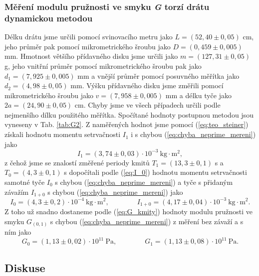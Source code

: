\documentclass[english]{article}
\newcommand{\unit}[1]{\mathrm{#1}}
\begin{document}
			\subsubsection{Měření modulu pružnosti ve smyku \emph{G} torzí drátu dynamickou metodou}
						Délku drátu jsme určili pomocí svinovacího metru jako $L = (52,40\pm0,05)$ cm, jeho průměr pak pomocí mikrometrického šroubu jako $D=(0,459\pm0,005)$ mm.  Hmotnost většího přídavného disku jsme určili jako $m = (127,31\pm0,05)$ g, jeho vnitřní průměr pomocí mikrometrického šroubu pak jako $d_1 = (7,925\pm0,005)$ mm a vnější průměr pomocí posuvného měřítka  jako $d_2 = (4,98\pm0,05)$ mm.  Výšku přídavného disku jsme změřili pomocí mikrometrického šroubu jako $v = (7,958\pm0,005)$ mm a délku tyče jako $2a = (24,90\pm0,05)$ cm. Chyby jsme ve všech případech určili podle nejmenšího dílku použitého měřítka.
					  	Spočítané hodnoty postupnou metodou jsou vyneseny v Tab. \ref{tab:G2}.
						Z naměřených hodnot jsme pomocí (\ref{eq:teo_steiner}) získali hodnotu momentu setrvačnosti $I_1$ i s chybou (\ref{eq:chyba_neprime_mereni}) jako 
						\begin{equation}
								I_1 = (3,74\pm0,03)       \cdot \unit{10^{-3}\ kg\cdot m^2},
						\end{equation}							
						z čehož jsme se znalostí změřené periody kmitů $T_1 = (13,3\pm0,1)$ s a $T_0 = (4,3\pm0,1)$ s dopočítali podle (\ref{eq:I_0}) hodnotu momentu setrvačnosti samotné tyče $I_0$ s chybou (\ref{eq:chyba_neprime_mereni}) a tyče s přidaným závažím $I_{1+0}$ s chybou (\ref{eq:chyba_neprime_mereni}) jako 
						\begin{equation}
								I_0 = (4,3\pm0,2)       \cdot \unit{10^{-4}\ kg\cdot m^2}, \qquad \qquad I_{1+0} = (4,17\pm0,04)       \cdot \unit{10^{-3}\ kg\cdot m^2}.
						\end{equation}							
						Z toho už snadno dostaneme podle (\ref{eq:G_kmity}) hodnoty modulu pružnosti ve smyku $G_{(0,1)}$ s chybou (\ref{eq:chyba_neprime_mereni}) z měření bez závaží a s ním jako 
						\begin{equation}
								G_0 = (1,13\pm0,02)       \cdot \unit{10^{11}\ Pa,} \qquad \qquad
								G_1 = (1,13\pm0,08)       \cdot \unit{10^{11}\ Pa.}
						\end{equation}		
					
	\subsection{Diskuse}
\end{document}
